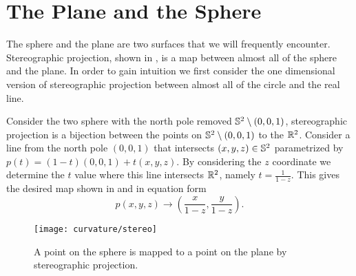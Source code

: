 \section{The Plane and the Sphere}
\label{sec:plane-sphere}


The sphere and the plane are two surfaces that we will
frequently encounter. 
Stereographic projection, shown in , is a map between almost all of the sphere
and the plane.
In order to gain intuition we first consider the one dimensional version of stereographic
projection between almost all of the circle and the real line.

\begin{example}\label{ex:stereo}
Consider the two sphere with the north pole removed $\mathbb{S}^2 \setminus (0,0,1)$,
stereographic projection is a bijection between the points on $\mathbb{S}^2 \setminus (0,0,1)$ to the $\mathbb{R}^2$.
Consider a line from the north pole $(0,0,1)$ that intersects $(x,y,z)\in \mathbb{S}^2$ parametrized by 
$p(t)=(1-t)(0,0,1)+t(x,y,z)$. By considering the $z$ coordinate we determine the $t$ value where this line
intersects $\mathbb{R}^2$, namely $t=\frac{1}{1-z}.$
This gives the desired map shown in  and in equation form
$$p(x,y,z)\to \left(\frac{x}{1-z},\frac{y}{1-z}\right).$$
\end{example}

\begin{figure}[htb]
	\centering
	\texttt{[image: curvature/stereo]}
	\caption{A point on the sphere is mapped to a point on the plane by stereographic projection.}
	\label{fig:stereo1}
\end{figure}
	
